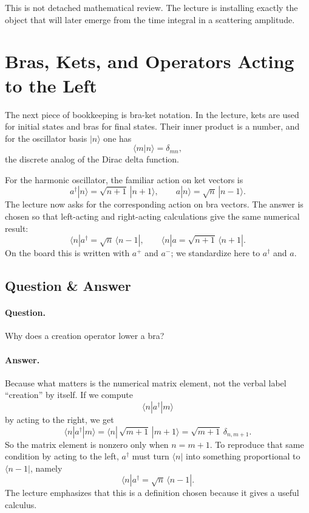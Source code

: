This is not detached mathematical review. The lecture is installing exactly the object that will later emerge from the time integral in a scattering amplitude.

\section{Bras, Kets, and Operators Acting to the Left}

The next piece of bookkeeping is bra-ket notation. In the lecture, kets are used for initial states and bras for final states. Their inner product is a number, and for the oscillator basis \(|n\rangle\) one has
\begin{equation}
\langle m|n\rangle=\delta_{mn},
\end{equation}
the discrete analog of the Dirac delta function.

For the harmonic oscillator, the familiar action on ket vectors is
\begin{equation}
a^\dagger|n\rangle=\sqrt{n+1}\,|n+1\rangle,
\qquad
a|n\rangle=\sqrt{n}\,|n-1\rangle.
\end{equation}
The lecture now asks for the corresponding action on bra vectors. The answer is chosen so that left-acting and right-acting calculations give the same numerical result:
\begin{equation}
\langle n|a^\dagger=\sqrt{n}\,\langle n-1|,
\qquad
\langle n|a=\sqrt{n+1}\,\langle n+1|.
\end{equation}
On the board this is written with \(a^+\) and \(a^-\); we standardize here to \(a^\dagger\) and \(a\).

\subsection{Question \& Answer}

\paragraph{Question.} Why does a creation operator lower a bra?

\paragraph{Answer.} Because what matters is the numerical matrix element, not the verbal label ``creation'' by itself. If we compute
\[
\langle n|a^\dagger|m\rangle
\]
by acting to the right, we get
\[
\langle n|a^\dagger|m\rangle
=
\langle n|\,\sqrt{m+1}\,|m+1\rangle
=
\sqrt{m+1}\,\delta_{n,m+1}.
\]
So the matrix element is nonzero only when \(n=m+1\). To reproduce that same condition by acting to the left, \(a^\dagger\) must turn \(\langle n|\) into something proportional to \(\langle n-1|\), namely
\[
\langle n|a^\dagger=\sqrt{n}\,\langle n-1|.
\]
The lecture emphasizes that this is a definition chosen because it gives a useful calculus.

